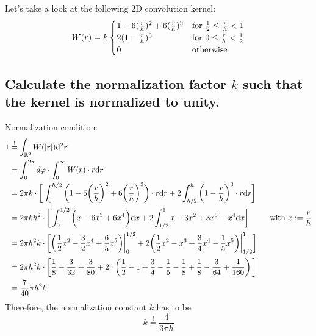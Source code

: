 Let's take a look at the following 2D convolution kernel:
\begin{equation}
    W(r)=k\begin{cases}
        1-6(\frac{r}{h})^2+6(\frac{r}{h})^3 
        & \textnormal{for }\frac{1}{2}\leq\frac{r}{h}<1 \\
        2(1-\frac{r}{h})^3
        & \textnormal{for }0\leq\frac{r}{h}<\frac{1}{2} \\
        0 
        & \textnormal{otherwise} \\
    \end{cases}
\end{equation}

\subsection{Calculate the normalization factor $k$ such that the 
kernel is normalized to unity.}
    Normalization condition:
    \begin{align}
        1
        &\overset{!}{=}\int_{\mathbb{R}^2}W(|\vec r|) \mathrm{d}^2\vec r \\
        &=\int_0^{2\pi}d\varphi\cdot\int_0^\infty W(r)\cdot r \mathrm{d} r \\
        &=2\pi k\cdot\bigg[
            \int_0^{h/2}\bigg(
                1-6\bigg(\frac{r}{h}\bigg)^2+
                6\bigg(\frac{r}{h}\bigg)^3
            \bigg)\cdot r \mathrm{d} r+2\int_{h/2}^h\bigg(1-\frac{r}{h}\bigg)^3\cdot r \mathrm{d} r
        \bigg] \\
        &=2\pi kh^2\cdot\bigg[
            \int_0^{1/2}\bigg(
                x-6x^3+
                6x^4
            \bigg) \mathrm{d} x+2\int_{1/2}^1 x - 3x^2 + 3x^3 - x^4 \mathrm{d} x
        \bigg] \ \ \ \ \ \ \ \ \textnormal{with $x:=\frac{r}{h}$} \\
        &=2\pi h^2k\cdot\bigg[
            \bigg(
                \frac{1}{2}x^2-\frac{3}{2}x^4 + \frac{6}{5}x^5 
            \bigg)\bigg|_0^{1/2}+2\bigg(
                \frac{1}{2}x^2 - x^3 + \frac{3}{4}x^4 - \frac{1}{5}x^5
            \bigg)\bigg|_{1/2}^{1}
        \bigg] \\
        &=2\pi h^2k\cdot\bigg[
            \frac{1}{8} - \frac{3}{32} + \frac{3}{80} + 2 \cdot \left(\frac{1}{2}- 1 + \frac{3}{4} -\frac{1}{5} - \frac{1}{8} + \frac{1}{8} -\frac{3}{64} + \frac{1}{160}\right)  
        \bigg] \\
        &=\frac{7}{40}\pi h^2k
    \end{align}
    Therefore, the normalization constant $k$ has to be
    \begin{equation}
        k\overset{!}{=}\frac{4}{3\pi h}
    \end{equation}
